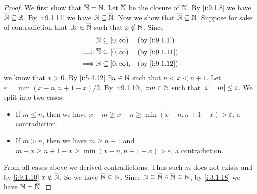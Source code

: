 \begin{proof}
  We first show that \(\overline{\mathbb{N}} = \mathbb{N}\).
  Let \(\overline{\mathbb{N}}\) be the closure of \(\mathbb{N}\).
  By \cref{i:9.1.8} we have \(\overline{\mathbb{N}} \subseteq \mathbb{R}\).
  By \cref{i:9.1.11} we have \(\mathbb{N} \subseteq \overline{\mathbb{N}}\).
  Now we show that \(\overline{\mathbb{N}} \subseteq \mathbb{N}\).
  Suppose for sake of contradiction that \(\exists x \in \overline{\mathbb{N}}\) such that \(x \notin \mathbb{N}\).
  Since
  \begin{align*}
             & \N \subseteq [0, \infty)                       &  & \by{i:9.1.1}  \\
    \implies & \overline{\N} \subseteq \overline{[0, \infty)} &  & \by{i:9.1.11} \\
    \implies & \overline{\N} \subseteq [0, \infty),           &  & \by{i:9.1.12}
  \end{align*}
  we know that \(x > 0\).
  By \cref{i:5.4.12} \(\exists n \in \mathbb{N}\) such that \(n < x < n + 1\).
  Let \(\varepsilon = \min(x - n, n + 1 - x) / 2\).
  By \cref{i:9.1.10}, \(\exists m \in \mathbb{N}\) such that \(\left\lvert x - m\right\rvert \leq \varepsilon\).
  We split into two cases:
  \begin{itemize}
    \item If \(m \leq n\), then we have \(x - m \geq x - n \geq \min(x - n, n + 1 - x) > \varepsilon\), a contradiction.
    \item If \(m > n\), then we have \(m \geq n + 1\) and \(m - x \geq n + 1 - x \geq \min(x - n, n + 1 - x) > \varepsilon\), a contradiction.
  \end{itemize}
  From all cases above we derived contradictions.
  Thus such \(m\) does not exists and by \cref{i:9.1.10} \(x \notin \overline{\mathbb{N}}\).
  So we have \(\overline{\mathbb{N}} \subseteq \mathbb{N}\).
  Since \(\mathbb{N} \subseteq \overline{\mathbb{N}} \land \overline{\mathbb{N}} \subseteq \mathbb{N}\), by \cref{i:3.1.18} we have \(\mathbb{N} = \overline{\mathbb{N}}\).


\end{proof}
